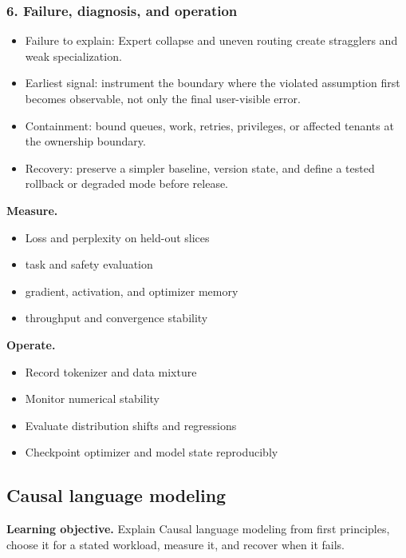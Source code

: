 \subsubsection*{6. Failure, diagnosis, and operation}
\begin{itemize}
\item Failure to explain: Expert collapse and uneven routing create stragglers and weak specialization.
\item Earliest signal: instrument the boundary where the violated assumption first becomes observable, not only the final user-visible error.
\item Containment: bound queues, work, retries, privileges, or affected tenants at the ownership boundary.
\item Recovery: preserve a simpler baseline, version state, and define a tested rollback or degraded mode before release.
\end{itemize}
\textbf{Measure.}\begin{itemize}
\item Loss and perplexity on held-out slices
\item task and safety evaluation
\item gradient, activation, and optimizer memory
\item throughput and convergence stability
\end{itemize}
\textbf{Operate.}\begin{itemize}
\item Record tokenizer and data mixture
\item Monitor numerical stability
\item Evaluate distribution shifts and regressions
\item Checkpoint optimizer and model state reproducibly
\end{itemize}
\subsection{Causal language modeling}
\textbf{Learning objective.} Explain Causal language modeling from first principles, choose it for a stated workload, measure it, and recover when it fails.
